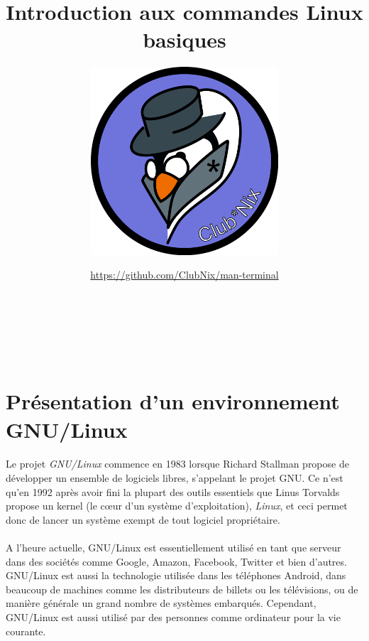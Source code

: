 \documentclass[french, a4paper, 12pt, titlepage]{article}
\begin{document}
\title{Introduction aux commandes Linux basiques}
\author{\includegraphics[width=7cm]{logo}}
\date{\url{https://github.com/ClubNix/man-terminal}}

\maketitle

\vfill
\pagebreak
\newpage
\thispagestyle{empty}
~


\strut\thispagestyle{empty}
\vfill
\pagebreak
\tableofcontents
\strut\thispagestyle{empty}

\vfill
\pagebreak
\newpage
\thispagestyle{empty}
~
\pagebreak

\setcounter{page}{1}

\section{Présentation d'un environnement GNU/Linux}

\paragraph{}
Le projet \textit{GNU/Linux} commence en 1983 lorsque Richard Stallman propose
de développer un ensemble de logiciels libres, s'appelant le projet GNU. Ce
n'est qu'en 1992 après avoir fini la plupart des outils essentiels que Linus
Torvalds propose un kernel (le cœur d'un système d'exploitation),
\textit{Linux}, et ceci permet donc de lancer un système exempt de tout
logiciel propriétaire.

\paragraph{}
A l'heure actuelle, GNU/Linux est essentiellement utilisé en tant que serveur
dans des sociétés comme Google, Amazon, Facebook, Twitter et bien d'autres.
GNU/Linux est aussi la technologie utilisée dans les téléphones Android, dans
beaucoup de machines comme les distributeurs de billets ou les télévisions, ou
de manière générale un grand nombre de systèmes embarqués. Cependant, GNU/Linux
est aussi utilisé par des personnes comme ordinateur pour la vie courante.
\end{document}
